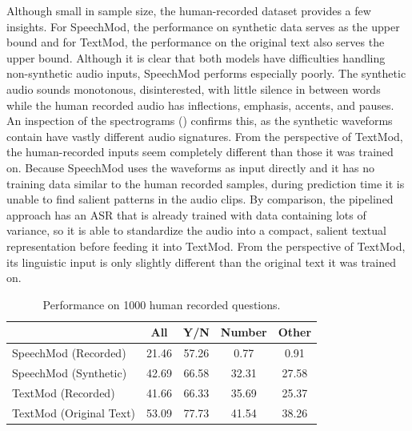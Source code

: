 \documentclass[letterpaper]{article} %
\begin{document}
Although small in sample size, the human-recorded dataset provides a few insights. For SpeechMod, the performance on synthetic data serves as the upper bound and for TextMod, the performance on the original text also serves the upper bound. Although it is clear that both models have difficulties handling non-synthetic audio inputs, SpeechMod performs especially poorly. The synthetic audio sounds monotonous, disinterested, with little silence in between words while the human recorded audio has inflections, emphasis, accents, and pauses. An inspection of the spectrograms () confirms this, as the synthetic waveforms contain have vastly different audio signatures. From the perspective of TextMod, the human-recorded inputs seem completely different than those it was trained on. Because SpeechMod uses the waveforms as input directly and it has no training data similar to the human recorded samples, during prediction time it is unable to find salient patterns in the audio clips. By comparison, the pipelined approach has an ASR that is already trained with data containing lots of variance, so it is able to standardize the audio into a compact, salient textual representation before feeding it into TextMod. From the perspective of TextMod, its linguistic input is only slightly different than the original text it was trained on.


\begin{table}[t]
\centering
\caption{Performance on 1000 human recorded questions.}
\label{table:recorded}
\begin{tabular}{l|cccc}
                        & All   & Y/N   & Number & Other \\ \hline
SpeechMod (Recorded)    & 21.46 & 57.26 & 0.77   & 0.91  \\
SpeechMod (Synthetic)   & 42.69 & 66.58 & 32.31  & 27.58 \\ \hline
TextMod (Recorded)      & 41.66 & 66.33 & 35.69  & 25.37 \\
TextMod (Original Text) & 53.09 & 77.73 & 41.54  & 38.26
\end{tabular}
\end{table}
\end{document}
